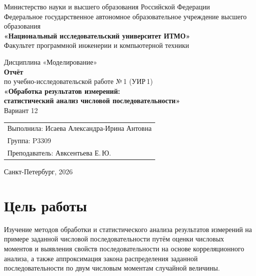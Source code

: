 \documentclass[a4paper,12pt]{article}
\newcommand{\Student}{Исаева Александра-Ирина Антовна}
\newcommand{\Group}{P3309}
\newcommand{\Teacher}{Авксентьева Е.\,Ю.}
\begin{document}
\begin{titlepage}
\centering
Министерство науки и высшего образования Российской Федерации\\
Федеральное государственное автономное образовательное учреждение высшего образования\\
\textbf{«Национальный исследовательский университет ИТМО»}\\[4pt]
Факультет программной инженерии и компьютерной техники

\vfill
{\large Дисциплина «Моделирование»}\\[14pt]
{\Large\textbf{Отчёт}}\\[6pt]
{\large по учебно-исследовательской работе №\,1 (УИР\,1)}\\[6pt]
{\large\textbf{«Обработка результатов измерений:\\ статистический анализ числовой последовательности»}}\\[14pt]
{\large Вариант 12}
\vfill

\begin{flushright}
\begin{tabular}{@{}l@{}}
Выполнила: \Student\\
Группа: \Group\\[8pt]
Преподаватель: \Teacher
\end{tabular}
\end{flushright}

\vfill
Санкт-Петербург, 2026
\end{titlepage}

\tableofcontents
\newpage

\section{Цель работы}
Изучение методов обработки и статистического анализа результатов измерений на примере заданной числовой последовательности путём оценки числовых моментов и выявления свойств последовательности на основе корреляционного анализа, а также аппроксимация закона распределения заданной последовательности по двум числовым моментам случайной величины.

\end{document}
